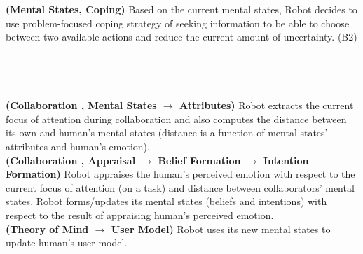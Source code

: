 \noindent\textbf{(Mental States, Coping)} Based on the current mental states,
Robot decides to use problem-focused coping strategy of seeking information to
be able to choose between two available actions and reduce the current amount of
uncertainty. (B2)\\

\noindent{}\\

\noindent{}\\

\noindent{}\\


\noindent{}\\

\noindent\textbf{(Collaboration , Mental States $\rightarrow$ Attributes)} Robot
extracts the current focus of attention during collaboration and also computes
the distance between its own and human's mental states (distance is a function
of mental states' attributes and human's emotion).\\

\noindent\textbf{(Collaboration , Appraisal $\rightarrow$ Belief Formation
$\rightarrow$ Intention Formation)} Robot appraises the human's perceived
emotion with respect to the current focus of attention (on a task) and distance
between collaborators' mental states. Robot forms/updates its mental states
(beliefs and intentions) with respect to the result of appraising human's
perceived emotion.\\

\noindent\textbf{(Theory of Mind $\rightarrow$ User Model)} Robot uses its new
mental states to update human's user model.\\

